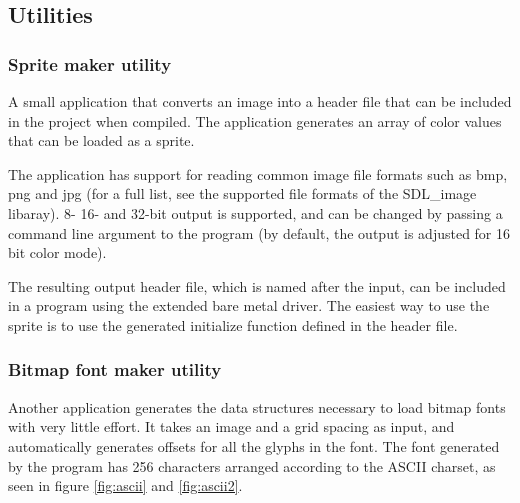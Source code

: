 \documentclass[10pt,a4paper]{article}
\begin{document}
\subsection{Utilities}
\subsubsection{Sprite maker utility}
\label{sec:spritemaker}
A small application that converts an image into a header file that can be included in the project when compiled. The application generates an array of color values that can be loaded as a sprite.

The application has support for reading common image file formats such as bmp, png and jpg (for a full list, see the supported file formats of the SDL\_image libaray). 8- 16- and 32-bit output is supported, and can be changed by passing a command line argument to the program (by default, the output is adjusted for 16 bit color mode).

The resulting output header file, which is named after the input, can be included in a program using the extended bare metal driver. The easiest way to use the sprite is to use the generated initialize function defined in the header file.

\subsubsection{Bitmap font maker utility}
\label{sec:bitmapfontmaker}
Another application generates the data structures necessary to load bitmap fonts with very little effort. It takes an image and a grid spacing as input, and automatically generates offsets for all the glyphs in the font. The font generated by the program has 256 characters arranged according to the ASCII charset, as seen in figure \ref{fig:ascii} and \ref{fig:ascii2}.
\end{document}
